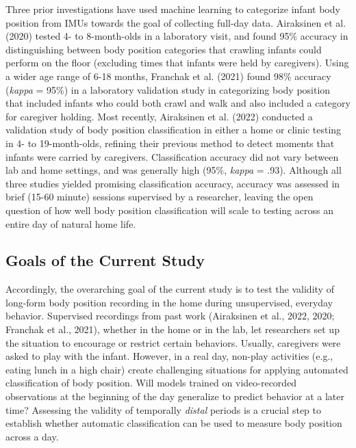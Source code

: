 \documentclass[
  man]{apa6}
\begin{document}
Three prior investigations have used machine learning to categorize infant body position from IMUs towards the goal of collecting full-day data. Airaksinen et al. (2020) tested 4- to 8-month-olds in a laboratory visit, and found 95\% accuracy in distinguishing between body position categories that crawling infants could perform on the floor (excluding times that infants were held by caregivers). Using a wider age range of 6-18 months, Franchak et al. (2021) found 98\% accuracy (\emph{kappa} = 95\%) in a laboratory validation study in categorizing body position that included infants who could both crawl and walk and also included a category for caregiver holding. Most recently, Airaksinen et al. (2022) conducted a validation study of body position classification in either a home or clinic testing in 4- to 19-month-olds, refining their previous method to detect moments that infants were carried by caregivers. Classification accuracy did not vary between lab and home settings, and was generally high (95\%, \emph{kappa} = .93). Although all three studies yielded promising classification accuracy, accuracy was assessed in brief (15-60 minute) sessions supervised by a researcher, leaving the open question of how well body position classification will scale to testing across an entire day of natural home life.

\hypertarget{goals-of-the-current-study}{%
\subsection{Goals of the Current Study}\label{goals-of-the-current-study}}

Accordingly, the overarching goal of the current study is to test the validity of long-form body position recording in the home during unsupervised, everyday behavior. Supervised recordings from past work (Airaksinen et al., 2022, 2020; Franchak et al., 2021), whether in the home or in the lab, let researchers set up the situation to encourage or restrict certain behaviors. Usually, caregivers were asked to play with the infant. However, in a real day, non-play activities (e.g., eating lunch in a high chair) create challenging situations for applying automated classification of body position. Will models trained on video-recorded observations at the beginning of the day generalize to predict behavior at a later time? Assessing the validity of temporally \emph{distal} periods is a crucial step to establish whether automatic classification can be used to measure body position across a day.
\end{document}
